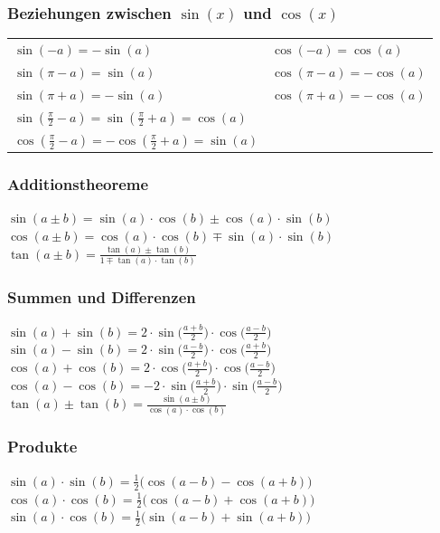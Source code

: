 		\subsubsection{Beziehungen zwischen $\sin(x)$ und $\cos(x)$}
		\begin{tabular}{ll}
		$\sin(-a) = -\sin(a)$ & $\cos(-a) = \cos(a)$ \\
		$\sin(\pi - a) = \sin(a)$ & $\cos(\pi -a) = - \cos(a)$ \\		
		$\sin(\pi + a) = -\sin(a)$ & $\cos(\pi + a) = - \cos(a)$ \\	
		$\sin(\frac{\pi}{2} - a) = \sin(\frac{\pi}{2} + a) = \cos(a)$ \\
		$\cos(\frac{\pi}{2} - a) = - \cos(\frac{\pi}{2} + a) = \sin(a)$\\		 
		\end{tabular}
		
		
		\vfill\null
		\columnbreak

		\subsubsection{Additionstheoreme}
		
		$\sin(a \pm b) = \sin(a) \cdot \cos(b) \pm \cos(a) \cdot \sin(b)$ \\
		$\cos(a \pm b) = \cos(a) \cdot \cos(b) \mp \sin(a) \cdot \sin(b) $ \\
		$\tan(a \pm b) = \frac{\tan(a) \pm \tan(b)}{1 \mp \tan(a) \cdot \tan(b)}$
		
	
		\subsubsection{Summen und Differenzen}
		
		$\sin(a) + \sin(b) = 2 \cdot \sin \big( \frac{a+b}{2} \big) \cdot \cos \big( \frac{a-b}{2} \big)$ \\
		$\sin(a) - \sin(b) = 2 \cdot \sin \big( \frac{a-b}{2} \big) \cdot \cos \big( \frac{a+b}{2} \big)$ \\
		$\cos(a) + \cos(b) = 2 \cdot \cos \big( \frac{a+b}{2} \big) \cdot \cos \big( \frac{a-b}{2} \big)$ \\
		$\cos(a) - \cos(b) = -2 \cdot \sin \big( \frac{a+b}{2} \big) \cdot \sin \big( \frac{a-b}{2} \big)$ \\
		$\tan(a) \pm \tan(b) = \frac{\sin(a \pm b)}{\cos(a) \cdot \cos(b)}$ 
		
			
		
		\subsubsection{Produkte}
		$\sin(a) \cdot \sin(b) = \frac{1}{2} \big( \cos(a-b) - \cos(a+b) \big) $ \\
		$\cos(a) \cdot \cos(b) = \frac{1}{2} \big( \cos(a-b) + \cos(a+b) \big) $ \\	
		$\sin(a) \cdot \cos(b) = \frac{1}{2} \big( \sin(a-b) + \sin(a+b) \big) $ 
			
